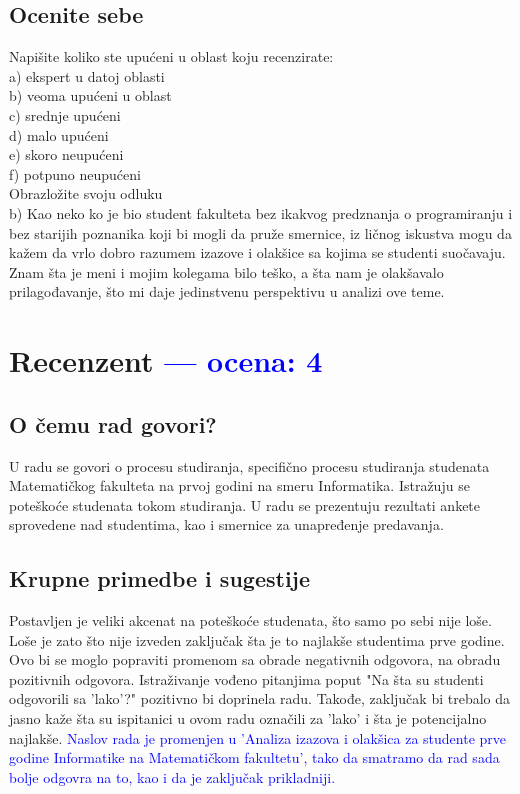 \documentclass[a4paper]{report}
\newcommand{\odgovor}[1]{\textcolor{blue}{#1}}
\begin{document}
\section{Ocenite sebe}
Napišite koliko ste upućeni u oblast koju recenzirate: \\
a) ekspert u datoj oblasti\\
b) veoma upućeni u oblast\\
c) srednje upućeni\\
d) malo upućeni \\
e) skoro neupućeni\\
f) potpuno neupućeni\\
Obrazložite svoju odluku\\
b) Kao neko ko je bio student fakulteta bez ikakvog predznanja o programiranju i bez starijih poznanika koji bi mogli da pruže smernice, iz ličnog iskustva mogu da kažem da vrlo dobro razumem izazove i olakšice sa kojima se studenti suočavaju. Znam šta je meni i mojim kolegama bilo teško, a šta nam je olakšavalo prilagođavanje, što mi daje jedinstvenu perspektivu u analizi ove teme.


\chapter{Recenzent \odgovor{--- ocena: 4} }


\section{O čemu rad govori?}

U radu se govori o procesu studiranja, specifično procesu studiranja studenata Matematičkog fakulteta na prvoj godini na smeru Informatika. Istražuju se poteškoće studenata tokom studiranja. U radu se prezentuju rezultati ankete sprovedene nad studentima, kao i smernice za unapređenje predavanja.

\section{Krupne primedbe i sugestije}

Postavljen je veliki akcenat na poteškoće studenata, što samo po sebi nije loše. Loše je zato što nije izveden zaključak šta je to najlakše studentima prve godine. Ovo bi se moglo popraviti promenom sa obrade negativnih odgovora, na obradu pozitivnih odgovora. Istraživanje vođeno pitanjima poput "Na šta su studenti odgovorili sa 'lako'?" pozitivno bi doprinela radu. Takođe, zaključak bi trebalo da jasno kaže šta su ispitanici u ovom radu označili za 'lako' i šta je potencijalno najlakše. \odgovor{Naslov rada je promenjen u 'Analiza izazova i olakšica za studente prve godine Informatike na  Matematičkom fakultetu', tako da smatramo da rad sada bolje odgovra na to, kao i da je zaključak prikladniji.}
\end{document}
